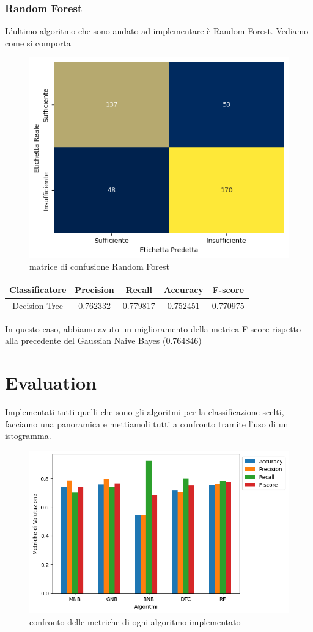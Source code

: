 \documentclass{article}
\begin{document}
\begin{titlepage}
        \subsubsection{Random Forest}
        L'ultimo algoritmo che sono andato ad implementare è Random Forest. Vediamo come si comporta
        \begin{figure}[ht]
            \centering
            \includegraphics[width=0.6\linewidth]{confusion_matrix-RF.png}
            \caption{  matrice di confusione Random Forest}
            \label{fig:enter-label}
        \end{figure}
        \begin{center}
        \begin{tabular}{|c|c|c|c|c|}
            \hline
            \textbf{Classificatore} & \textbf{Precision} & \textbf{Recall} & \textbf{Accuracy}& \textbf{F-score}\\ \hline
            Decision Tree & 0.762332 & 0.779817 & 0.752451 & 0.770975\\ \hline
        \end{tabular}
        \end{center}
        In questo caso, abbiamo avuto un miglioramento della metrica F-score rispetto alla precedente del Gaussian Naive Bayes (0.764846)
        
        \newpage
        \section{Evaluation}
        Implementati tutti quelli che sono gli algoritmi per la classificazione scelti, facciamo una panoramica e mettiamoli tutti a confronto tramite l'uso di un istogramma.
        \begin{figure}[ht]
            \centering
            \includegraphics[width=0.6\linewidth]{comparison.png}
            \caption{  confronto delle metriche di ogni algoritmo implementato}
            \label{fig:enter-label}
        \end{figure}
        

\end{titlepage}
\end{document}
